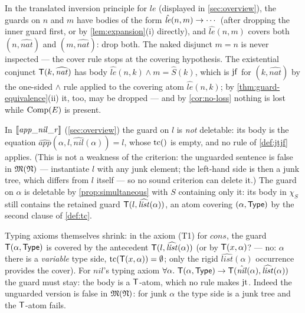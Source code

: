 \begin{example}
  \label{ex:le-inv}
  In the translated inversion principle for $\mathit{le}$ (dis\-played in
  \cref{sec:overview}), the guards on $n$ and $m$ have bodies of the form
  $\hat{\mathit{le}}(n,m) \rightarrow \cdots$ (after dropping the inner guard
  first, or by \cref{lem:expansion}(i) directly), and
  $\hat{\mathit{le}}(n,m)$ covers both $(n,\widehat{\mathit{nat}})$ and
  $(m,\widehat{\mathit{nat}})$: drop both.  The naked disjunct $m = n$ is
  never inspected --- the cover rule stops at the covering hypothesis.
  The existential conjunct $\mathsf{T}(k,\widehat{\mathit{nat}})$ has body
  $\hat{\mathit{le}}(n,k) \wedge m = \hat S(k)$, which is $\mathrm{jf}$ for
  $(k,\widehat{\mathit{nat}})$ by the one-sided $\wedge$ rule applied to
  the covering atom $\hat{\mathit{le}}(n,k)$; by
  \cref{thm:guard-equivalence}(ii) it, too, may be dropped ---
  and by \cref{cor:no-loss} nothing is lost while $\mathrm{Comp}(E)$ is present.
\end{example}

\begin{example}
  \label{ex:app-nil}
  In $[\![ \mathit{app\_nil\_r} ]\!]$ (\cref{sec:overview}) the guard on $l$
  is \emph{not} deletable: its body is the equation
  $\hat{\mathit{app}}(\alpha, l, \hat{\mathit{nil}}(\alpha)) = l$, whose
  $\mathrm{tc}()$ is empty, and no rule of \cref{def:jtjf} applies.  (This is not
  a weakness of the criterion: the unguarded sentence is false in $\mathfrak{M}(\mathfrak{N})$
  --- instantiate $l$ with any junk element; the left-hand side is then a
  junk tree, which differs from $l$ itself --- so no sound criterion can
  delete it.)  The guard on $\alpha$ is deletable by
  \cref{prop:simultaneous} with $S$ containing only it: its body in
  $\chi_S$ still contains the retained guard
  $\mathsf{T}(l, \widehat{\mathit{list}}(\alpha))$, an atom covering
  $(\alpha, \mathsf{Type})$ by the second clause of \cref{def:tc}.
\end{example}

\begin{example}
  \label{ex:typing-axiom}
  Typing axioms themselves shrink: in the axiom (T1) for
  $\mathit{cons}$, the guard $\mathsf{T}(\alpha, \mathsf{Type})$ is covered by the
  antecedent $\mathsf{T}(l, \widehat{\mathit{list}}(\alpha))$ (or by
  $\mathsf{T}(x,\alpha)$? --- no: $\alpha$ there is a \emph{variable} type side,
  $\mathrm{tc}(\mathsf{T}(x,\alpha)) = \emptyset$; only the rigid
  $\widehat{\mathit{list}}(\alpha)$ occurrence provides the cover).  For
  $\mathit{nil}$'s typing axiom
  $\forall\alpha.\ \T(\alpha,\TypeC) \imp
  \T(\hat{\mathit{nil}}(\alpha), \widehat{\mathit{list}}(\alpha))$ the
  guard must stay: the body is a $\mathsf{T}$-atom, which no rule makes $\mathrm{jt}$.
  Indeed the unguarded version is false in $\mathfrak{M}(\mathfrak{N})$: for junk $\alpha$ the
  type side is a junk tree and the $\mathsf{T}$-atom fails.
\end{example}
